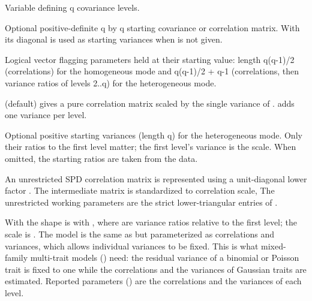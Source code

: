 \documentclass[a4paper]{book}
\begin{document}
\begin{Arguments}
\begin{ldescription}
\item[\code{x}] Variable defining q covariance levels.
\item[\code{theta}] Optional positive-definite q by q starting covariance or correlation matrix.
With  its diagonal is used as starting
variances when  is not given.
\item[\code{fixed}] Logical vector flagging parameters held at their starting value:
length q(q-1)/2 (correlations) for the homogeneous mode and
q(q-1)/2 + q-1 (correlations, then variance ratios of levels 2..q) for the
heterogeneous mode.
\item[\code{variance}]  (default) gives a pure correlation
matrix scaled by the single variance of .
 adds one variance per level.
\item[\code{values}] Optional positive starting variances (length q) for the
heterogeneous mode. Only their ratios to the first level matter; the first
level's variance is the  scale. When omitted, the starting ratios
are taken from the data.
\end{ldescription}
\end{Arguments}
%
\begin{Details}\relax
An unrestricted SPD correlation matrix is represented using a unit-diagonal lower factor .  The intermediate matrix  is standardized to correlation scale,  The unrestricted working parameters are the strict lower-triangular entries of .

With  the shape is  with
, where
 are variance ratios relative to
the first level; the  scale is . The model is the
same as  but parameterized as correlations and variances,
which allows individual variances to be fixed. This is what mixed-family
multi-trait models () need: the residual variance of a
binomial or Poisson trait is fixed to one while the correlations and the
variances of Gaussian traits are estimated. Reported parameters
() are the correlations and the variances of each
level.
\end{Details}
\end{document}

